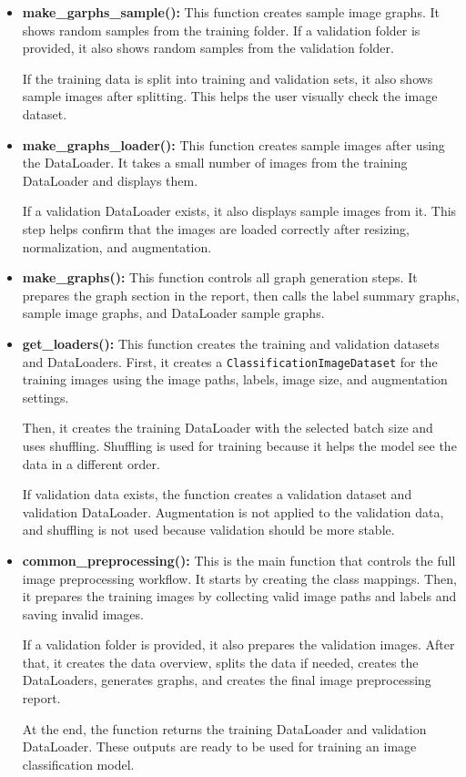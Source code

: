 \documentclass[12pt,a4paper]{report}
\begin{document}
\begin{itemize}
    \item \textbf{make\_garphs\_sample():}
    This function creates sample image graphs. It shows random samples from the training
    folder. If a validation folder is provided, it also shows random samples from the
    validation folder.

    If the training data is split into training and validation sets, it also shows sample
    images after splitting. This helps the user visually check the image dataset.

    \item \textbf{make\_graphs\_loader():}
    This function creates sample images after using the DataLoader. It takes a small
    number of images from the training DataLoader and displays them.

    If a validation DataLoader exists, it also displays sample images from it. This step
    helps confirm that the images are loaded correctly after resizing, normalization, and
    augmentation.

    \item \textbf{make\_graphs():}
    This function controls all graph generation steps. It prepares the graph section in
    the report, then calls the label summary graphs, sample image graphs, and DataLoader
    sample graphs.

    \item \textbf{get\_loaders():}
    This function creates the training and validation datasets and DataLoaders. First, it
    creates a \texttt{ClassificationImageDataset} for the training images using the image
    paths, labels, image size, and augmentation settings.

    Then, it creates the training DataLoader with the selected batch size and uses
    shuffling. Shuffling is used for training because it helps the model see the data in
    a different order.

    If validation data exists, the function creates a validation dataset and validation
    DataLoader. Augmentation is not applied to the validation data, and shuffling is not
    used because validation should be more stable.

    \item \textbf{common\_preprocessing():}
    This is the main function that controls the full image preprocessing workflow. It
    starts by creating the class mappings. Then, it prepares the training images by
    collecting valid image paths and labels and saving invalid images.

    If a validation folder is provided, it also prepares the validation images. After
    that, it creates the data overview, splits the data if needed, creates the
    DataLoaders, generates graphs, and creates the final image preprocessing report.

    At the end, the function returns the training DataLoader and validation DataLoader.
    These outputs are ready to be used for training an image classification model.
\end{itemize}
\end{document}

